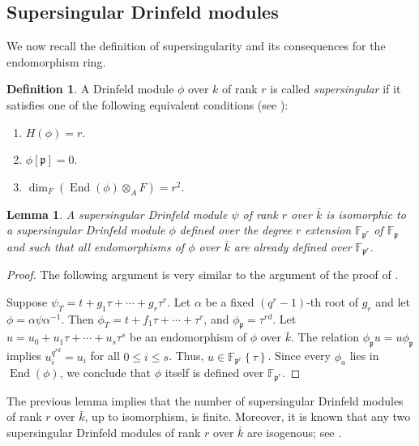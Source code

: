 \documentclass[12pt]{amsart}
\newtheorem{lem}[thm]{Lemma}
\theoremstyle{definition}
\newtheorem{defn}[thm]{Definition}
\theoremstyle{remark}
\numberwithin{equation}{section}
\numberwithin{thm}{section}
\DeclareMathOperator{\End}{End}
\newcommand{\fp}{\mathfrak{p}}
\newcommand{\F}{\mathbb{F}}
\newcommand{\twist}[1]{#1\!\left\{\tau\right\}}
\begin{document}
	
	
	\subsection{Supersingular Drinfeld modules}\label{ssSSDM}
	We now recall the definition of supersingularity and its consequences for the endomorphism ring.
	
	\begin{defn}
		A Drinfeld module $\phi$ over $k$ of rank $r$ is called
		\textit{supersingular} if it satisfies one of the following equivalent conditions
		(see \cite[Sec. 4]{Gekeler91}):
		\begin{enumerate}
			\item $H(\phi)=r$.
			\item $\phi[\fp]=0$.
			\item $\dim_F(\End(\phi)\otimes_A F)=r^2$.
		\end{enumerate}
	\end{defn}
	
	\begin{lem}\label{lemEndomSS}
		A supersingular Drinfeld module $\psi$ of rank $r$ over $\bar{k}$ is isomorphic to a supersingular
		Drinfeld module $\phi$ defined over the degree $r$ extension $\F_{\fp^r}$ of $\F_\fp$ and such that all endomorphisms
		of $\phi$ over $\bar{k}$ are already defined over $\F_{\fp^r}$.
	\end{lem}
	\begin{proof} The following argument is very similar to the argument of the proof of \cite[Prop. 4.2]{Gekeler91}.
		
		Suppose $\psi_T=t+g_1\tau+\cdots+g_r\tau^r$. Let $\alpha$ be a fixed $(q^r-1)$-th root of $g_r$ and
		let $\phi=\alpha \psi\alpha^{-1}$. Then $\phi_T=t+f_1\tau+\cdots+\tau^r$, and $\phi_\fp=\tau^{rd}$. Let $u=u_0+u_1\tau+\cdots+u_s\tau^s$
		be an endomorphism of $\phi$ over $\bar{k}$. The relation $\phi_\fp u=u \phi_\fp$
		implies $u_i^{q^{rd}}=u_i$ for all $0\leq i\leq s$. Thus, $u\in \twist{\F_{\fp^r}}$. Since every $\phi_a$ lies in $\End(\phi)$, we conclude that
		$\phi$ itself is defined over $\F_{\fp^r}$.
	\end{proof}
	
	The previous lemma implies that the number of supersingular Drinfeld modules of rank $r$ over $\bar{k}$, up to isomorphism, is finite.
	Moreover, it is known that any two supersingular Drinfeld modules of rank $r$ over $\bar{k}$ are isogenous; see \cite[Lem. 4.4.3]{PapikianGTM}.
	
\end{document}

